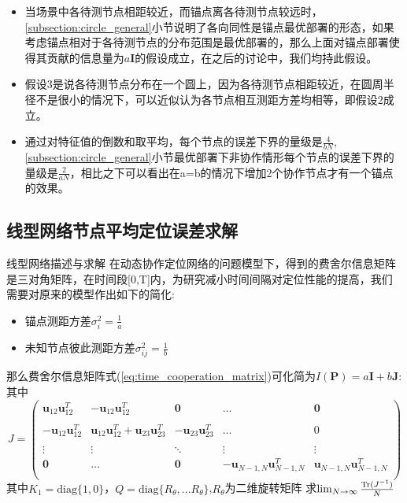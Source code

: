 \begin{remark}


\begin{itemize}
  \item 当场景中各待测节点相距较近，而锚点离各待测节点较远时，\ref{subsection:circle_general}小节说明了各向同性是锚点最优部署的形态，如果考虑锚点相对于各待测节点的分布范围是最优部署的，那么上面对锚点部署使得其贡献的信息量为$a\bm{I}$的假设成立，在之后的讨论中，我们均持此假设。
  \item 假设3是说各待测节点分布在一个圆上，因为各待测节点相距较近，在圆周半径不是很小的情况下，可以近似认为各节点相互测距方差均相等，即假设2成立。
  \item 通过对特征值的倒数和取平均，每个节点的误差下界的量级是$\frac{4}{bN}$,\ref{subsection:circle_general}小节最优部署下非协作情形每个节点的误差下界的量级是$\frac{2}{aN}$，相比之下可以看出在a=b的情况下增加2个协作节点才有一个锚点的效果。
\end{itemize}

\end{remark}
\subsection{线型网络节点平均定位误差求解}
{线型网络描述与求解}
在动态协作定位网络的问题模型下，得到的费舍尔信息矩阵是三对角矩阵，在时间段[0,T]内，为研究减小时间间隔对定位性能的提高，我们需要对原来的模型作出如下的简化:
\begin{itemize}
\item 锚点测距方差$\sigma_i^2=\frac{1}{a}$
\item 未知节点彼此测距方差$\sigma^2_{ij}=\frac{1}{b}$
\end{itemize}
那么费舍尔信息矩阵式(\ref{eq:time_cooperation_matrix})可化简为$I(\bm{P})=a\bm{I}+b\bm{J}$:
其中\[
J=\left(
\begin{array}{ccccc}
\bm{u}_{12}\bm{u}_{12}^T&-\bm{u}_{12}\bm{u}_{12}^T&\bm{0}&\dots&\bm{0}\\
&&&&\\
-\bm{u}_{12}\bm{u}_{12}^T&\bm{u}_{12}\bm{u}_{12}^T+\bm{u}_{23}\bm{u}_{23}^T&-\bm{u}_{23}\bm{u}_{23}^T&\dots&0\\
&&&&\\
\vdots &\vdots&\ddots &\vdots&\vdots\\
\bm{0}&\dots&\bm{0}&-\bm{u}_{N-1,N}\bm{u}_{N-1,N}^T&\bm{u}_{N-1,N}\bm{u}_{N-1,N}^T\\
\end{array}
\right)
\]
其中$K_1=\text{diag}\{1,0\}$，$Q=\text{diag}\{R_{\theta},...R_{\theta}\}$,$R_{\theta}$为二维旋转矩阵
求$\lim_{N\to \infty}\frac{\operatorname{Tr}(J^{-1})}{N}$


